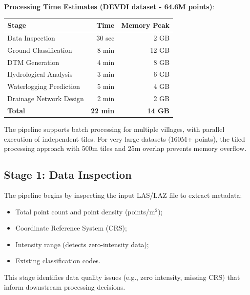 \documentclass[a4paper,12pt]{article}
\begin{document}
\bigskip

\textbf{Processing Time Estimates (DEVDI dataset - 64.6M points)}:

\begin{table}[H]
	\centering
	\begin{tabularx}{0.8\linewidth}{|L|R|R|}
		\toprule
		\textbf{Stage}          & \textbf{Time}   & \textbf{Memory Peak} \\
		\midrule
		Data Inspection         & 30 sec          & 2 GB                 \\
		Ground Classification   & 8 min           & 12 GB                \\
		DTM Generation          & 4 min           & 8 GB                 \\
		Hydrological Analysis   & 3 min           & 6 GB                 \\
		Waterlogging Prediction & 5 min           & 4 GB                 \\
		Drainage Network Design & 2 min           & 2 GB                 \\
		\hline
		\textbf{Total}          & \textbf{22 min} & \textbf{14 GB}       \\
		\bottomrule
	\end{tabularx}
\end{table}

\bigskip

The pipeline supports batch processing for multiple villages, with parallel execution of independent tiles. For very large datasets (160M+ points), the tiled processing approach with 500m tiles and 25m overlap prevents memory overflow.

\subsection{Stage 1: Data Inspection}

The pipeline begins by inspecting the input LAS/LAZ file to extract metadata:
\begin{itemize}
	\item Total point count and point density (points/m$^2$);
	\item Coordinate Reference System (CRS);
	\item Intensity range (detects zero-intensity data);
	\item Existing classification codes.
\end{itemize}

This stage identifies data quality issues (e.g., zero intensity, missing CRS) that inform downstream processing decisions.
\end{document}
